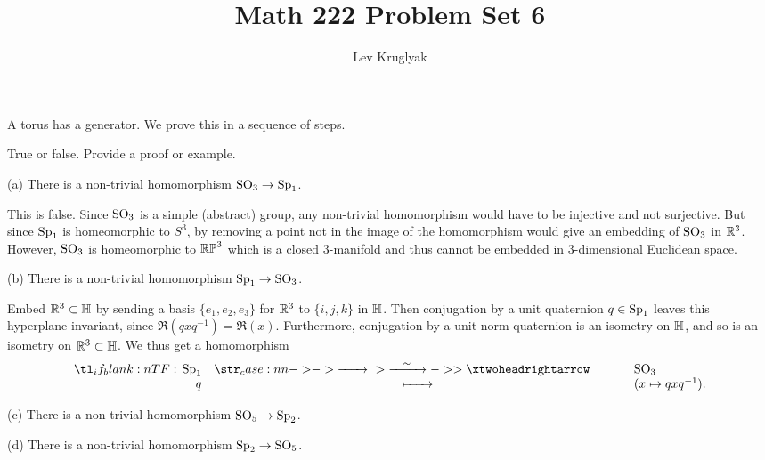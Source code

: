 \documentclass{lkx_pset}
\title{Math 222 Problem Set 6}
\author{Lev Kruglyak}
\begin{document}
\maketitle

\begin{problem}{1}
  A torus has a generator. We prove this in a sequence of steps.
\end{problem}

\begin{problem}{2}
  True or false. Provide a proof or example.
\end{problem}
\begin{parts}
  \begin{part}{(a)}
    There is a non-trivial homomorphism $\operatorname{SO}_3 \to \operatorname{Sp}_1$.
  \end{part}

  This is false. Since $\operatorname{SO}_3$ is a simple (abstract) group, any non-trivial homomorphism would have to be injective and not surjective. 
  But since $\operatorname{Sp}_1$ is homeomorphic to $S^3$, by removing a point not in the image of the homomorphism would give an embedding of $\operatorname{SO}_3$ in $\mathbb{R}^3$. However, $\operatorname{SO}_3$ is homeomorphic to $\mathbb{RP}^3$ which is a closed $3$-manifold and thus cannot be embedded in $3$-dimensional Euclidean space.

  \begin{part}{(b)}
    There is a non-trivial homomorphism $\operatorname{Sp}_1 \to \operatorname{SO}_3$.
  \end{part}

  Embed $\mathbb{R}^3\subset \mathbb{H}$ by sending a basis $\{e_1,e_2,e_3\}$ for $\mathbb{R}^3$ to $\{i,j,k\}$ in $\mathbb{H}$. Then conjugation by a unit quaternion $q\in \operatorname{Sp}_1$ leaves this hyperplane invariant, since $\Re(qxq^{-1})=\Re(x)$. Furthermore, conjugation by a unit norm quaternion is an isometry on $\mathbb{H}$, and so is an isometry on $\mathbb{R}^3\subset \mathbb{H}$.  We thus get a homomorphism
  \[
    \lkxfunc{}{\Sp_1}{\SO_3}{q}{(x\mapsto qxq^{-1}).}
  \]

  \begin{part}{(c)}
    There is a non-trivial homomorphism $\operatorname{SO}_5 \to \operatorname{Sp}_2$.
  \end{part}
    
  \begin{part}{(d)}
    There is a non-trivial homomorphism $\operatorname{Sp}_2 \to \operatorname{SO}_5$.
  \end{part}

\end{parts}
\end{document}
